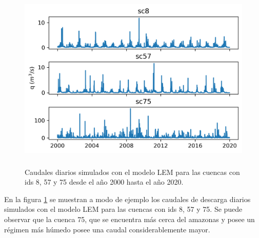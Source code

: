 \begin{figure}[h!]
    \begin{center}
      \includegraphics[height=3.5in]{Figures/caudales.png}
      \caption{ Caudales diarios simulados con el modelo LEM para las cuencas con ids 8, 57 y 75 desde el año 2000 hasta
      el año 2020. }
      \label{caudales}
    \end{center}
  \end{figure}

En la figura \ref{caudales} se muestran a modo de ejemplo los caudales de descarga diarios simulados con el modelo LEM 
para las cuencas con ids 8, 57 y 75. Se puede observar que la cuenca 75, que se encuentra más cerca del amazonas y posee 
un régimen más húmedo posee una caudal considerablemente mayor.



